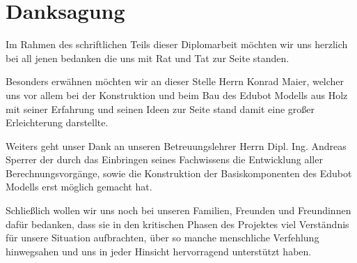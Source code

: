 {}

\section*{Danksagung}
Im Rahmen des schriftlichen Teils dieser Diplomarbeit möchten wir uns herzlich bei all jenen bedanken die uns mit Rat und Tat zur Seite standen.

Besonders erwähnen möchten wir an dieser Stelle Herrn Konrad Maier, welcher uns vor allem bei der Konstruktion und beim Bau des Edubot Modells aus Holz mit seiner Erfahrung und seinen Ideen zur Seite stand damit eine großer Erleichterung darstellte.

Weiters geht unser Dank an unseren Betreuungslehrer Herrn Dipl. Ing. Andreas Sperrer der durch das Einbringen seines Fachwissens die Entwicklung aller Berechnungsvorgänge, sowie die Konstruktion der Basiskomponenten des Edubot Modells erst möglich gemacht hat.

Schließlich wollen wir uns noch bei unseren Familien, Freunden und Freundinnen dafür bedanken, dass sie in den kritischen Phasen des Projektes viel Verständnis für unsere Situation aufbrachten, über so manche menschliche Verfehlung hinwegsahen und uns in jeder Hinsicht hervorragend unterstützt haben. 
